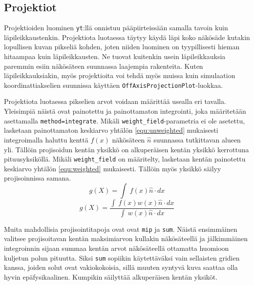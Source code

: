 \documentclass[12pt,a4paper]{article}
\newcommand{\yt}{\texttt{yt}}
\begin{document}
\subsection{Projektiot} %
Projektioiden luominen \yt :llä onnistuu pääpiirteissään samalla tavoin kuin läpi\-leik\-kaus\-ten\-kin. Projektiota luotaessa täytyy käydä läpi koko näkösäde kutakin lopullisen kuvan pikseliä kohden, joten niiden luominen on tyypillisesti hieman hitaampaa kuin läpi\-leikkausten. Ne tuovat kuitenkin usein läpileikkauksia paremmin esiin näkösäteen suunnassa laajempia rakenteita. Kuten läpileikkauksiakin, myös projektioita voi tehdä myös muissa kuin simulaation koordinattiakselien suunnissa käyttäen \texttt{OffAxisProjectionPlot}-luokkaa. \cite{sliceproj}

\begin{sloppypar}Projektiota luotaessa pikselien arvot voidaan määrittää usealla eri tavalla. Yleisimpiä näistä ovat painotettu ja painottamaton integrointi, joka määritetään asettamalla \texttt{method=integrate}. Mikäli \texttt{weight\_field}-parametria ei ole asetettu, lasketaan painottamaton keskiarvo yhtälön \ref{equ:unweighted} mukaisesti integroimalla haluttu kenttä $f(x)$ näkösäteen $\hat{n}$ suunnassa tutkittavan alueen yli. Tällöin projisoidun kentän yksikkö on alkuperäisen kentän yksikkö kerrottuna pituusyksiköllä. Mikäli \texttt{weight\_field} on määritelty, lasketaan kentän painotettu keskiarvo yhtälön \ref{equ:weighted} mukaisesti. Tällöin myös yksikkö säilyy projisoinnissa samana. \cite{sliceproj}
\begin{equation}\label{equ:unweighted}
	g(X) = {\int\ {f(x)\hat{n}\cdot{dx}}}
\end{equation}
\begin{equation}\label{equ:weighted}
	g(X) = \frac{\int\ {f(x)w(x)\hat{n}\cdot{dx}}}{\int\ {w(x)\hat{n}\cdot{dx}}}
\end{equation}
\end{sloppypar} 

Muita mahdollisia projisointitapoja ovat ovat \texttt{mip} ja \texttt{sum}. Näistä ensimmäinen valitsee projisoitavan kentän maksimiarvon kullakin näkösäteellä ja jälkimmäinen integroinnin sijaan summaa kentän arvot näkösäteellä ottamatta huomioon kuljetun polun pituutta. Siksi \texttt{sum} sopiikin käytettäväksi vain sellaisten gridien kanssa, joiden solut ovat vakiokokoisia, sillä muuten syntyvä kuva saattaa olla hyvin epäfysikaalinen. Kumpikin säilyttää alkuperäisen kentän yksiköt. \cite{sliceproj, projection}
\end{document}
